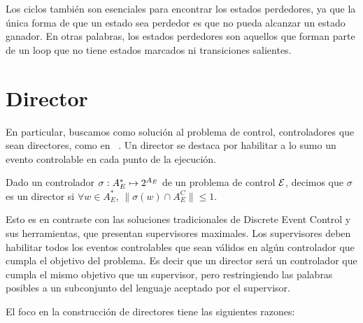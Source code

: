 Los ciclos también son esenciales para encontrar los estados perdedores, ya que la única forma de que un estado sea perdedor es que no pueda alcanzar un estado ganador. En otras palabras, los estados perdedores son aquellos que forman parte de un loop que no tiene estados marcados ni transiciones salientes.


\section{Director} \label{chpt:director}
En particular, buscamos como solución al problema de control, controladores que sean directores, como en ~\cite{Huang:2007:Optimal,Huang:2008:DCD}. Un director se destaca por habilitar a lo sumo un evento controlable en cada punto de la ejecución. 

\begin{definition}[Director] \label{def:director}
	Dado un controlador $\sigma : A_E^* \mapsto 2^{A_E}$ de un problema de control $\mathcal{E}$, decimos que $\sigma$ es un director si $\forall w \in A_E^*$, $\|\sigma(w) \cap A_E^C\| \leq 1$.	
\end{definition}

Esto es en contraste con las soluciones tradicionales de Discrete Event Control y sus herramientas, \cite{Mohajerani:2014:Supremica} que presentan supervisores maximales. Los supervisores deben habilitar todos los eventos controlables que sean válidos en algún controlador que cumpla el objetivo del problema. Es decir que un director será un controlador que cumpla el mismo objetivo que un supervisor, pero restringiendo las palabras posibles a un subconjunto del lenguaje aceptado por el supervisor.

El foco en la construcción de directores tiene las siguientes razones:

